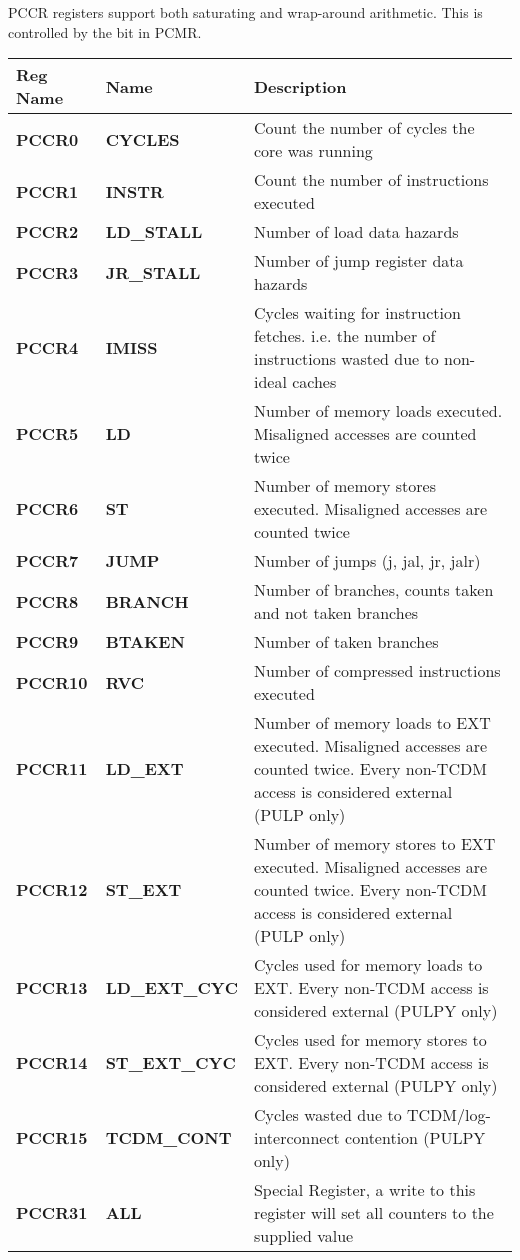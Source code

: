PCCR registers support both saturating and wrap-around arithmetic. This is
controlled by the  bit in PCMR.

\begin{table}[H]
\begin{tabularx}{\textwidth}{@{}llX@{}} \toprule
  \textbf{Reg Name} & \textbf{Name}       & Description \\ \toprule
  \textbf{PCCR0}  & \textbf{CYCLES}       & Count the number of cycles the core was running \\ \hline
  \textbf{PCCR1}  & \textbf{INSTR}        & Count the number of instructions executed \\ \hline
  \textbf{PCCR2}  & \textbf{LD\_STALL}    & Number of load data hazards \\ \hline
  \textbf{PCCR3}  & \textbf{JR\_STALL}    & Number of jump register data hazards \\ \hline
  \textbf{PCCR4}  & \textbf{IMISS}        & Cycles waiting for instruction fetches. i.e. the number of instructions wasted due to non-ideal caches \\ \hline
  \textbf{PCCR5}  & \textbf{LD}           & Number of memory loads executed. Misaligned accesses are counted twice \\ \hline
  \textbf{PCCR6}  & \textbf{ST}           & Number of memory stores executed. Misaligned accesses are counted twice \\ \hline
  \textbf{PCCR7}  & \textbf{JUMP}         & Number of jumps (j, jal, jr, jalr)\\ \hline
  \textbf{PCCR8}  & \textbf{BRANCH}       & Number of branches, counts taken and not taken branches\\ \hline
  \textbf{PCCR9}  & \textbf{BTAKEN}       & Number of taken branches \\ \hline
  \textbf{PCCR10} & \textbf{RVC}          & Number of compressed instructions executed \\ \hline
  \textbf{PCCR11} & \textbf{LD\_EXT}      & Number of memory loads to EXT executed. Misaligned accesses are counted twice. Every non-TCDM access is considered external (PULP only) \\ \hline
  \textbf{PCCR12} & \textbf{ST\_EXT}      & Number of memory stores to EXT executed. Misaligned accesses are counted twice. Every non-TCDM access is considered external (PULP only) \\ \hline
  \textbf{PCCR13} & \textbf{LD\_EXT\_CYC} & Cycles used for memory loads to EXT. Every non-TCDM access is considered external (PULPY only) \\ \hline
  \textbf{PCCR14} & \textbf{ST\_EXT\_CYC} & Cycles used for memory stores to EXT. Every non-TCDM access is considered external (PULPY only) \\ \hline
  \textbf{PCCR15} & \textbf{TCDM\_CONT}   & Cycles wasted due to TCDM/log-interconnect contention (PULPY only) \\ \hline
  \textbf{PCCR31} & \textbf{ALL}          & Special Register, a write to this register will set all counters to the supplied value\\ \bottomrule
\end{tabularx}
\end{table}

